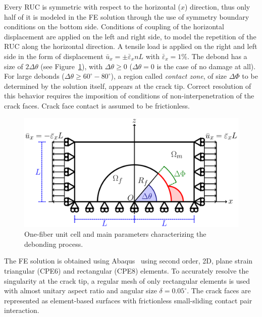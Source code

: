 Every RUC is symmetric with respect to the horizontal ($x$) direction, thus only half of it is modeled in the FE solution through the use of symmetry boundary conditions on the bottom side. Conditions of coupling of the horizontal displacement are applied on the left and right side, to model the repetition of the RUC along the horizontal direction. A tensile load is applied on the right and left side in the form of displacement $\bar{u}_{x}=\pm\bar{\varepsilon}_{x}nL$ with $\bar{\varepsilon}_{x}=1\%$. The debond has a size of $2\Delta\theta$ (see Figure~\ref{paperE:fig:ruc}), with $\Delta\theta\geq0$ ($\Delta\theta=0$ is the case of no damage at all). For large debonds ($\Delta\theta\geq 60^{\circ}-80^{\circ}$), a region called \emph{contact zone}, of size $\Delta\Phi$ to be determined by the solution itself, appears at the crack tip. Correct resolution of this behavior requires the imposition of conditions of non-interpenetration of the crack faces. Crack face contact is assumed to be frictionless.

\begin{figure}[!h]
\centering
        \includegraphics[height=0.15\textheight]{RUC.pdf}
\caption{One-fiber unit cell and main parameters characterizing the debonding process.}\label{paperE:fig:ruc}
\end{figure}

The FE solution is obtained using Abaqus~\cite{abq12} using second order, 2D, plane strain triangular (CPE6) and rectangular (CPE8) elements. To accurately resolve the singularity at the crack tip, a regular mesh of only rectangular elements is used with almost unitary aspect ratio and angular size $\delta=0.05^{\circ}$. The crack faces are represented as element-based surfaces with frictionless small-sliding contact pair interaction.

